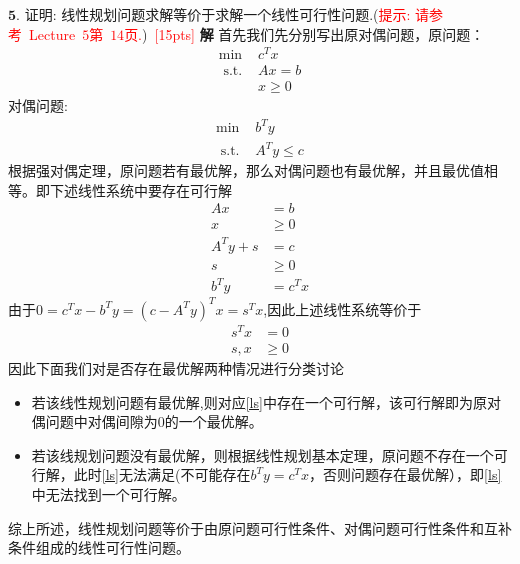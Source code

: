 \documentclass[10pt]{article}
\begin{document}
$\bm{5}.$
证明: 线性规划问题求解等价于求解一个线性可行性问题.(\textcolor{red}{提示: 请参考~Lecture~$5$第~$14$页.})~\textcolor{red}{[15pts]}
\textbf{解}
首先我们先分别写出原对偶问题，原问题：
	\begin{equation}
		\begin{array}{ll}
			\min & c^Tx \\
			\text { s.t. } & Ax=b \\
			& x\ge 0
		\end{array}
	\end{equation}
对偶问题:
	\begin{equation}
		\begin{array}{ll}
			\min & b^Ty \\
			\text { s.t. } & A^Ty\le c 
		\end{array}
	\end{equation}
根据强对偶定理，原问题若有最优解，那么对偶问题也有最优解，并且最优值相等。即下述线性系统中要存在可行解
\begin{equation}
\begin{array}{ll}
	Ax &= b\\
	x&\ge 0 \\
	A^Ty+s&=c\\
	s&\ge 0\\
	b^Ty &=c^Tx
\end{array}
\end{equation}
由于$0=c^Tx-b^Ty=(c-A^Ty)^Tx=s^Tx$,因此上述线性系统等价于
\begin{equation}\label{ls}
	\begin{array}{ll}
	s^Tx &= 0\\
	s,x&\ge 0	
	\end{array}
\end{equation}
因此下面我们对是否存在最优解两种情况进行分类讨论
\begin{itemize}
	\item 若该线性规划问题有最优解,则对应\ref{ls}中存在一个可行解，该可行解即为原对偶问题中对偶间隙为0的一个最优解。
	\item 若该线规划问题没有最优解，则根据线性规划基本定理，原问题不存在一个可行解，此时\ref{ls}无法满足(不可能存在$b^Ty=c^Tx$，否则问题存在最优解），即\ref{ls}中无法找到一个可行解。
\end{itemize}
综上所述，线性规划问题等价于由原问题可行性条件、对偶问题可行性条件和互补条件组成的线性可行性问题。
\end{document}
